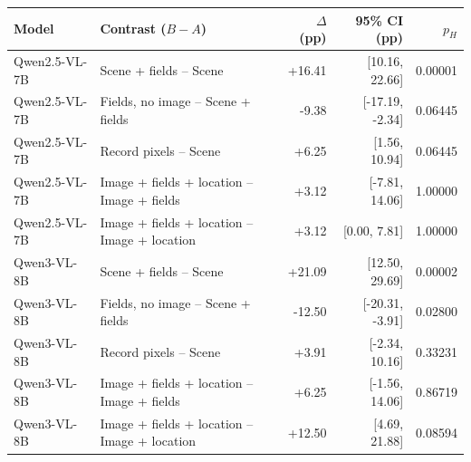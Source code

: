 \begin{tabular}{llrrr}
\toprule
Model & Contrast ($B-A$) & $\Delta$ (pp) & 95\% CI (pp) & $p_H$ \\
\midrule
Qwen2.5-VL-7B & Scene + fields -- Scene & +16.41 & [10.16, 22.66] & 0.00001 \\
Qwen2.5-VL-7B & Fields, no image -- Scene + fields & -9.38 & [-17.19, -2.34] & 0.06445 \\
Qwen2.5-VL-7B & Record pixels -- Scene & +6.25 & [1.56, 10.94] & 0.06445 \\
Qwen2.5-VL-7B & Image + fields + location -- Image + fields & +3.12 & [-7.81, 14.06] & 1.00000 \\
Qwen2.5-VL-7B & Image + fields + location -- Image + location & +3.12 & [0.00, 7.81] & 1.00000 \\
Qwen3-VL-8B & Scene + fields -- Scene & +21.09 & [12.50, 29.69] & 0.00002 \\
Qwen3-VL-8B & Fields, no image -- Scene + fields & -12.50 & [-20.31, -3.91] & 0.02800 \\
Qwen3-VL-8B & Record pixels -- Scene & +3.91 & [-2.34, 10.16] & 0.33231 \\
Qwen3-VL-8B & Image + fields + location -- Image + fields & +6.25 & [-1.56, 14.06] & 0.86719 \\
Qwen3-VL-8B & Image + fields + location -- Image + location & +12.50 & [4.69, 21.88] & 0.08594 \\
\bottomrule
\end{tabular}
